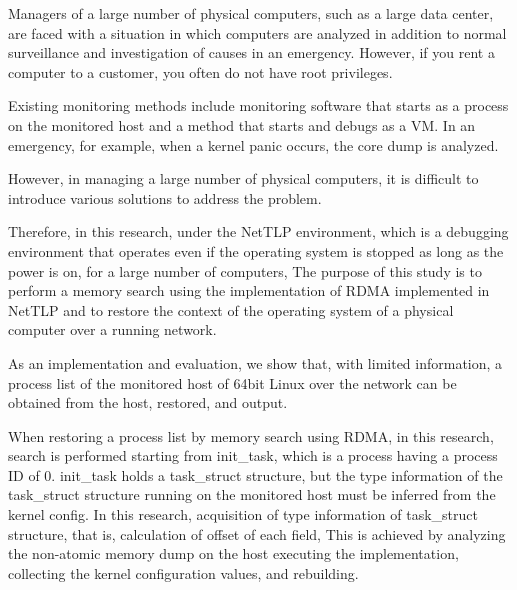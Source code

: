 \begin{eabstract}

Managers of a large number of physical computers, such as a large data center, are faced with a situation in which computers are analyzed in addition to normal surveillance and investigation of causes in an emergency.
However, if you rent a computer to a customer, you often do not have root privileges.

Existing monitoring methods include monitoring software that starts as a process on the monitored host and a method that starts and debugs as a VM.
In an emergency, for example, when a kernel panic occurs, the core dump is analyzed.

However, in managing a large number of physical computers, it is difficult to introduce various solutions to address the problem.

Therefore, in this research, under the NetTLP environment, which is a debugging environment that operates even if the operating system is stopped as long as the power is on, for a large number of computers,
The purpose of this study is to perform a memory search using the implementation of RDMA implemented in NetTLP and to restore the context of the operating system of a physical computer over a running network.

As an implementation and evaluation, we show that, with limited information, a process list of the monitored host of 64bit Linux over the network can be obtained from the host, restored, and output.

When restoring a process list by memory search using RDMA, in this research, search is performed starting from init\_task, which is a process having a process ID of 0.
init\_task holds a task\_struct structure, but the type information of the task\_struct structure running on the monitored host must be inferred from the kernel config.
In this research, acquisition of type information of task\_struct structure, that is, calculation of offset of each field,
This is achieved by analyzing the non-atomic memory dump on the host executing the implementation, collecting the kernel configuration values, and rebuilding.

\end{eabstract}
